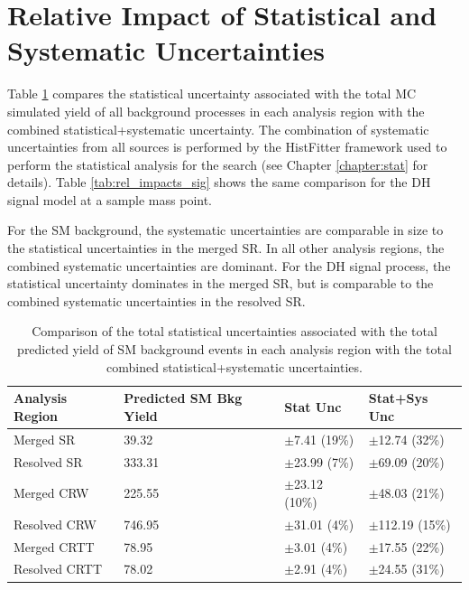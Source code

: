 \section{Relative Impact of Statistical and Systematic Uncertainties}

Table \ref{tab:rel_impacts_bkg} compares the statistical uncertainty associated with the total MC simulated yield of all background processes in each analysis region with the combined statistical+systematic uncertainty. The combination of systematic uncertainties from all sources is performed by the HistFitter framework used to perform the statistical analysis for the search (see Chapter \ref{chapter:stat} for details). Table \ref{tab:rel_impacts_sig} shows the same comparison for the DH signal model at a sample mass point.

For the SM background, the systematic uncertainties are comparable in size to the statistical uncertainties in the merged SR. In all other analysis regions, the combined systematic uncertainties are dominant. For the DH signal process, the statistical uncertainty dominates in the merged SR, but is comparable to the combined systematic uncertainties in the resolved SR.

\begin{table}[ht]
\begin{center}
\caption{\label{tab:rel_impacts_bkg} Comparison of the total statistical uncertainties associated with the total predicted yield of SM background events in each analysis region with the total combined statistical+systematic uncertainties.}
\begin{tabular}{l l l l }
\toprule
\textbf{Analysis Region}& \textbf{Predicted SM Bkg Yield} & \textbf{Stat Unc} & \textbf{Stat+Sys Unc} \tabularnewline
\midrule
\midrule
Merged SR & 39.32 & \(\pm\)7.41 (19\%) & \(\pm\)12.74 (32\%) \tabularnewline
\midrule
Resolved SR & 333.31 & \(\pm\)23.99 (7\%) & \(\pm\)69.09 (20\%) \tabularnewline
\midrule
Merged CRW & 225.55 & \(\pm\)23.12 (10\%) & \(\pm\)48.03 (21\%) \tabularnewline
\midrule
Resolved CRW & 746.95 & \(\pm\)31.01 (4\%) & \(\pm\)112.19 (15\%) \tabularnewline
\midrule
Merged CRTT & 78.95 & \(\pm\)3.01 (4\%) & \(\pm\)17.55 (22\%) \tabularnewline
\midrule
Resolved CRTT & 78.02 & \(\pm\)2.91 (4\%) & \(\pm\)24.55 (31\%) \tabularnewline
\bottomrule
\end{tabular}
\end{center}
\end{table}

